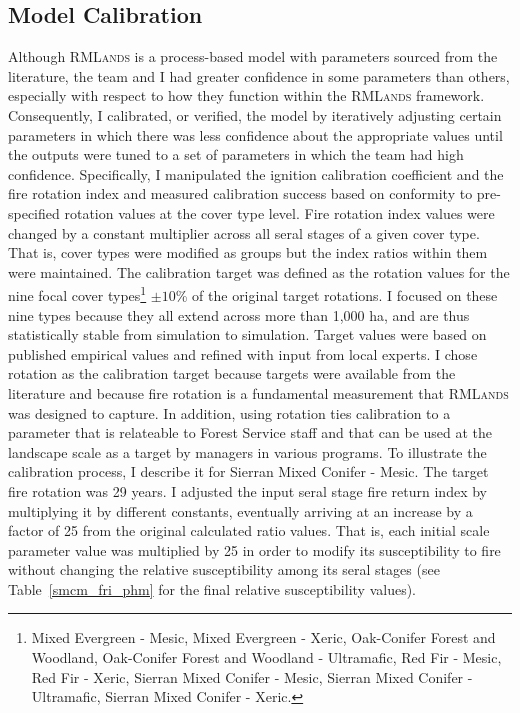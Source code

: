 \subsection{Model Calibration}
Although \textsc{RMLands} is a process-based model with parameters sourced from the literature, the team and I had greater confidence in some parameters than others, especially with respect to how they function within the \textsc{RMLands} framework. Consequently, I calibrated, or verified, the model by iteratively adjusting certain parameters in which there was less confidence about the appropriate values until the outputs were tuned to a set of parameters in which the team had high confidence. Specifically, I manipulated the ignition calibration coefficient and the fire rotation index and measured calibration success based on conformity to pre-specified rotation values at the cover type level. Fire rotation index values were changed by a constant multiplier across all seral stages of a given cover type. That is, cover types were modified as groups but the index ratios within them were maintained. The calibration target was defined as the rotation values for the nine focal cover types\footnote{Mixed Evergreen - Mesic, Mixed Evergreen - Xeric, Oak-Conifer Forest and Woodland, Oak-Conifer Forest and Woodland - Ultramafic, Red Fir - Mesic, Red Fir - Xeric, Sierran Mixed Conifer - Mesic, Sierran Mixed Conifer - Ultramafic, Sierran Mixed Conifer - Xeric.}  $\pm 10$\% of the original target rotations. I focused on these nine types because they all extend across more than 1,000 ha, and are thus statistically stable from simulation to simulation. Target values were based on published empirical values and refined with input from local experts. I chose rotation as the calibration target because targets were available from the literature and because fire rotation is a fundamental measurement that \textsc{RMLands} was designed to capture. In addition, using rotation ties calibration to a parameter that is relateable to Forest Service staff and that can be used at the landscape scale as a target by managers in various programs. To illustrate the calibration process, I describe it for Sierran Mixed Conifer - Mesic. The target fire rotation was 29 years. I adjusted the input seral stage fire return index by multiplying it by different constants, eventually arriving at an increase by a factor of 25 from the original calculated ratio values. That is, each initial scale parameter value was multiplied by 25 in order to modify its susceptibility to fire without changing the relative susceptibility among its seral stages (see Table~\ref{smcm_fri_phm} for the final relative susceptibility values). 



